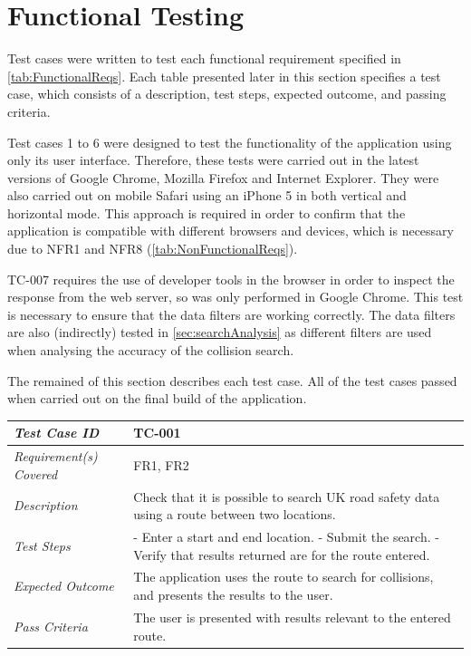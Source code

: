 \documentclass[authoryearcitations]{UoYCSproject}
\begin{document}
\section{Functional Testing}

Test cases were written to test each functional requirement specified in \autoref{tab:FunctionalReqs}. Each table presented later in this section specifies a test case, which consists of a description, test steps, expected outcome, and passing criteria.

Test cases 1 to 6 were designed to test the functionality of the application using only its user interface. Therefore, these tests were carried out in the latest versions of Google Chrome, Mozilla Firefox and Internet Explorer. They were also carried out on mobile Safari using an iPhone 5 in both vertical and horizontal mode. This approach is required in order to confirm that the application is compatible with different browsers and devices, which is necessary due to NFR1 and NFR8 (\autoref{tab:NonFunctionalReqs}).

TC-007 requires the use of developer tools in the browser in order to inspect the response from the web server, so was only performed in Google Chrome. This test is necessary to ensure that the data filters are working correctly. The data filters are also (indirectly) tested in \autoref{sec:searchAnalysis} as different filters are used when analysing the accuracy of the collision search.

The remained of this section describes each test case. All of the test cases passed when carried out on the final build of the application.

\begin{tabular}{| p{2.5cm} | p{11cm} |}
	\hline
	\textit{Test Case ID} & TC-001 \\ \hline
	\textit{Requirement(s) Covered} & FR1, FR2 \\ \hline
	\textit{Description} & Check that it is possible to search UK road safety data using a route between two locations.  \\ \hline
	\textit{Test Steps}& - Enter a start and end location.
	\newline - Submit the search.
	\newline - Verify that results returned are for the route entered.
 \\ \hline
	\textit{Expected Outcome} & The application uses the route to search for collisions, and presents the results to the user.  \\ \hline
	\textit{Pass Criteria} & The user is presented with results relevant to the entered route.  \\ \hline
\end{tabular}
\end{document}
